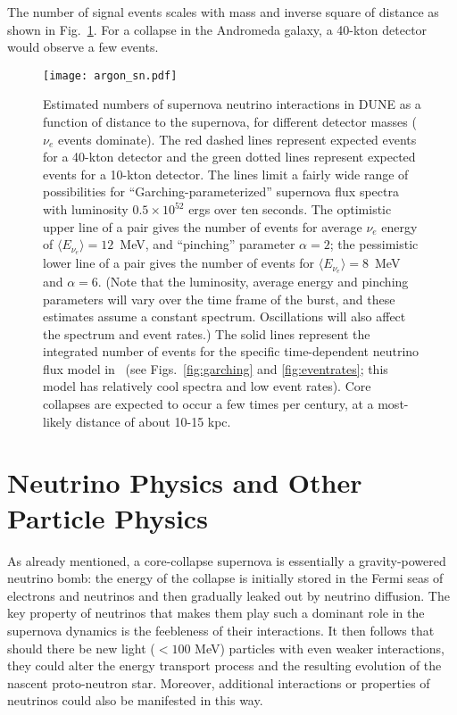 The number of signal events scales with mass and inverse square of distance as shown in Fig.~\ref{fig:ratesvsdist}.  For a collapse in the Andromeda galaxy, a 40-kton detector would observe a few events.

\begin{figure}[!htb]
\centering
\texttt{[image: argon\_sn.pdf]}
\caption[Rates vs distance]{Estimated numbers of supernova neutrino interactions in DUNE as a function of distance to the supernova, for different detector masses ($\nu_e$ events dominate). The red dashed lines represent expected events for a 40-kton detector and the green dotted lines represent expected events for a 10-kton detector. The lines limit a fairly wide range of possibilities for ``Garching-parameterized'' supernova flux spectra with luminosity $0.5\times 10^{52}$ ergs over ten seconds. The optimistic upper line of a pair gives the number of events for average $\nu_e$ energy of $\langle E_{\nu_e}\rangle =12$~MeV, and ``pinching'' parameter $\alpha=2$; the pessimistic lower line of a pair gives the number of events for $\langle E_{\nu_e}\rangle=8$~MeV and $\alpha=6$. (Note that the luminosity, average energy and pinching parameters will vary over the time frame of the burst, and these estimates assume a constant spectrum. Oscillations will also affect the spectrum and event rates.) The solid lines represent the integrated number of events for the specific time-dependent neutrino flux model in~\cite{Huedepohl:2009wh} (see Figs.~\ref{fig:garching} and \ref{fig:eventrates}; this model has relatively cool spectra and low event rates). Core collapses are expected to occur a few times per century, at a most-likely distance of about 10-15 kpc.}

  \label{fig:ratesvsdist}
\end{figure}



\section{Neutrino Physics and Other Particle Physics}
\label{sec:physics-snblowe-neutrino-physics}

As already mentioned, a core-collapse supernova is essentially a gravity-powered neutrino bomb: the energy of the collapse is initially stored in the Fermi seas of electrons and neutrinos and then gradually leaked out by neutrino diffusion. The key property of neutrinos that makes them play such a dominant role in the supernova dynamics is the feebleness of their interactions. It then follows that should there be new light ($< 100$ MeV) particles with even weaker interactions, they could alter the energy transport process and the resulting evolution of the nascent proto-neutron star. Moreover, additional interactions or properties of neutrinos could also be manifested in this way. 

